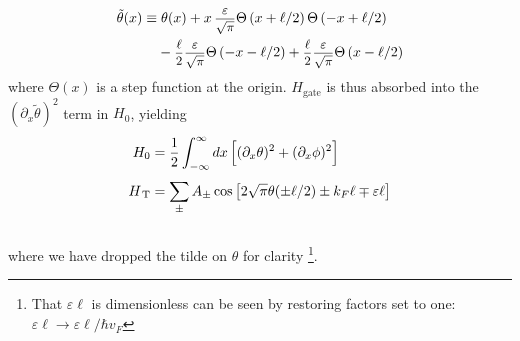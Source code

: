 \documentclass[aps,prb,reprint,floatfix,superscriptaddress,amssymb,amsmath]{revtex4-2}
\newcommand{\HT}{H_\text{\,T}}
\newcommand{\sdfrac}[2]{\mbox{\small$\displaystyle\frac{#1}{#2}$}}
\newcommand{\hub}[1]{\textcolor{red}{#1}}
\begin{document}
\begin{equation}
\begin{aligned}
\tilde\theta(x) \equiv &\; \theta(x)  + x\, \sdfrac{\varepsilon}{\sqrt{\pi}} \Theta\left(x+\ell/2\right)\Theta\left(-x+\ell/2\right) \\
&- \sdfrac{\ell}{2}\sdfrac{\varepsilon}{\sqrt{\pi}} \Theta\left(-x-\ell/2\right) 
+ \sdfrac{\ell}{2}\sdfrac{\varepsilon}{\sqrt{\pi}}\Theta\left(x-\ell/2\right) 
\end{aligned}
\end{equation}
where $\Theta(x)$ is a step function at the origin. 
 $H_\text{gate}$ is thus absorbed into the $(\partial_x\tilde\theta)^2$ term in $H_0$, yielding
\begin{subequations}
\begin{align}
H_0 & = \frac{1}{2} \int_{-\infty}^\infty dx \, 
\Big[(\partial_x {\theta})^2 + (\partial_x {\phi})^2 \Big]  
\label{eq:H0_strong2}\\[3pt]
\HT & = \sum_\pm A_\pm 
\cos\big[2\sqrt{\pi}\theta(\pm\ell/2) \pm k_F\ell \mp \varepsilon\ell \big] 
\label{eq:HT_boson2}
\end{align}
\label{eq:Hboson2}
\end{subequations}\vspace*{-0.40cm}\\
where we have dropped the tilde on $\theta$ for clarity 
\footnote{That $\varepsilon\ell$ is dimensionless can be seen by restoring factors set to one: $\varepsilon\ell \!\to\! \varepsilon\ell/\hbar v_F$}. 

\end{document}
